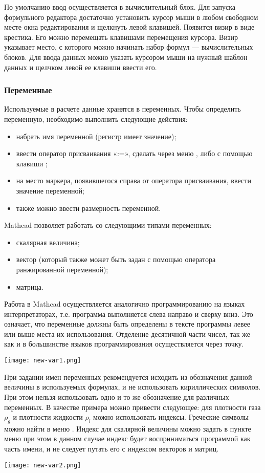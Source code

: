 По умолчанию ввод осуществляется в вычислительный блок. Для запуска формульного редактора достаточно установить курсор мыши в любом свободном месте окна редактирования и щелкнуть левой клавишей. Появится визир в виде крестика. Его можно перемещать клавишами перемещения курсора. Визир указывает место, с которого можно начинать набор формул --- вычислительных блоков. Для ввода данных можно указать курсором мыши на нужный шаблон данных и щелчком левой ее клавиши ввести его.


\subsubsection*{Переменные}
Используемые в расчете данные хранятся в переменных. Чтобы определить переменную, необходимо выполнить следующие действия:
\begin{itemize}
	\item набрать имя переменной (регистр имеет значение);
	\item ввести оператор присваивания «:=», сделать через меню  ,  либо с помощью клавиши \keys{:};
	\item на место маркера, появившегося справа от оператора присваивания, ввести значение переменной;
	\item также можно ввести размерность переменной.
\end{itemize}
Mathcad позволяет работать со следующими типами переменных:
\begin{itemize}
\item скалярная величина;
\item вектор (который также может быть задан с помощью оператора ранжированной переменной);
\item матрица.
\end{itemize}

Работа в Mathcad осуществляется аналогично программированию на языках интерпретаторах, т.е. программа выполняется слева направо и сверху вниз. Это означает, что переменные должны быть определены в тексте программы левее или выше места их использования. Отделение десятичной части чисел, так же как и в большинстве языков программирования осуществляется через точку.
\begin{center}
	\texttt{[image: new-var1.png]}
\end{center}

При задании имен переменных рекомендуется исходить из обозначения данной величины в используемых формулах, и не использовать кириллических символов. При этом нельзя использовать одно и то же обозначение для различных переменных. В качестве примера можно привести следующее: для плотности газа $\rho_g$ и плотности жидкости $\rho_l$ можно использовать индексы. Греческие символы можно найти в меню  . Индекс для скалярной величины можно задать в пункте меню  при этом в данном случае индекс будет восприниматься программой как часть имени, и не следует путать его с индексом векторов и матриц.
\begin{center}
	\texttt{[image: new-var2.png]}
\end{center}


